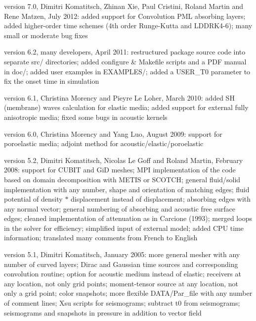 version 7.0, Dimitri Komatitsch, Zhinan Xie, Paul Cristini, Roland Martin and Rene Matzen, July 2012:\newline
added support for Convolution PML absorbing layers;
added higher-order time schemes (4th order Runge-Kutta and LDDRK4-6);
many small or moderate bug fixes\newline

version 6.2, many developers, April 2011:\newline
restructured package source code into separate src/ directories;
added configure \& Makefile scripts and a PDF manual in doc/;
added user examples in EXAMPLES/;
added a USER\_T0 parameter to fix the onset time in simulation\newline

version 6.1, Christina Morency and Pieyre Le Loher, March 2010:\newline
added SH (membrane) waves calculation for elastic media;
added support for external fully anisotropic media;
fixed some bugs in acoustic kernels\newline

version 6.0, Christina Morency and Yang Luo, August 2009:\newline
support for poroelastic media;
adjoint method for acoustic/elastic/poroelastic\newline

version 5.2, Dimitri Komatitsch, Nicolas Le Goff and Roland Martin, February 2008:\newline
support for CUBIT and GiD meshes;
MPI implementation of the code based on domain decomposition with METIS or SCOTCH;
general fluid/solid implementation with any number, shape and orientation of matching edges;
fluid potential of density $*$ displacement instead of displacement;
absorbing edges with any normal vector;
general numbering of absorbing and acoustic free surface edges;
cleaned implementation of attenuation as in Carcione (1993);
merged loops in the solver for efficiency;
simplified input of external model;
added CPU time information;
translated many comments from French to English\newline

version 5.1, Dimitri Komatitsch, January 2005:\newline
more general mesher with any number of curved layers;
Dirac and Gaussian time sources and corresponding convolution routine;
option for acoustic medium instead of elastic;
receivers at any location, not only grid points;
moment-tensor source at any location, not only a grid point;
color snapshots;
more flexible DATA/Par\_file with any number of comment lines;
Xsu scripts for seismograms;
subtract t0 from seismograms;
seismograms and snapshots in pressure in addition to vector field\newline

